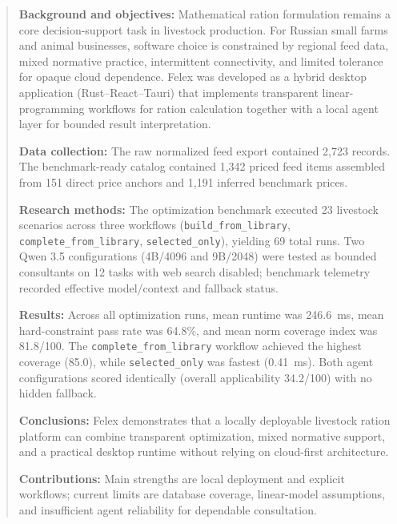 \documentclass[a4paper,fleqn]{cas-sc}
\begin{document}
\begin{abstract}
\textbf{Background and objectives:} Mathematical ration formulation remains a core decision-support task in livestock production. For Russian small farms and animal businesses, software choice is constrained by regional feed data, mixed normative practice, intermittent connectivity, and limited tolerance for opaque cloud dependence. Felex was developed as a hybrid desktop application (Rust--React--Tauri) that implements transparent linear-programming workflows for ration calculation together with a local agent layer for bounded result interpretation.

\textbf{Data collection:} The raw normalized feed export contained 2,723 records. The benchmark-ready catalog contained 1,342 priced feed items assembled from 151 direct price anchors and 1,191 inferred benchmark prices.

\textbf{Research methods:} The optimization benchmark executed 23 livestock scenarios across three workflows (\texttt{build\_from\_library}, \texttt{complete\_from\_library}, \texttt{selected\_only}), yielding 69 total runs. Two Qwen 3.5 configurations (4B/4096 and 9B/2048) were tested as bounded consultants on 12 tasks with web search disabled; benchmark telemetry recorded effective model/context and fallback status.

\textbf{Results:} Across all optimization runs, mean runtime was 246.6~ms, mean hard-constraint pass rate was 64.8\%, and mean norm coverage index was 81.8/100. The \texttt{complete\_from\_library} workflow achieved the highest coverage (85.0), while \texttt{selected\_only} was fastest (0.41~ms). Both agent configurations scored identically (overall applicability 34.2/100) with no hidden fallback.

\textbf{Conclusions:} Felex demonstrates that a locally deployable livestock ration platform can combine transparent optimization, mixed normative support, and a practical desktop runtime without relying on cloud-first architecture.

\textbf{Contributions:} Main strengths are local deployment and explicit workflows; current limits are database coverage, linear-model assumptions, and insufficient agent reliability for dependable consultation.
\end{abstract}

\end{document}
